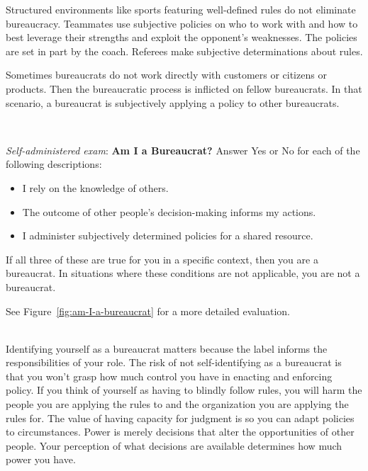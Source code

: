 Structured environments like sports featuring well-defined rules do not eliminate bureaucracy. Teammates use subjective policies on who to work with and how to best leverage their strengths and exploit the opponent's weaknesses. The policies are set in part by the coach. Referees make subjective determinations about rules.

Sometimes bureaucrats do not work directly with customers or citizens or products. Then the bureaucratic process is inflicted on fellow bureaucrats. In that scenario, a bureaucrat is subjectively applying a policy to other bureaucrats. 

\ \\


\begin{quizbox}{
      \textit{Self-administered exam}: 
      \textbf{Am I a Bureaucrat?}
}
Answer Yes or No for each of the following descriptions:
\begin{itemize}
    \item I rely on the knowledge of others. 
    \item The outcome of other people's decision-making informs my actions. 
    \item I administer subjectively determined policies for a shared resource. 
\end{itemize}
If all three of these are true for you in a specific context, then you are a bureaucrat. In situations where these conditions are not applicable, you are not a bureaucrat.
\label{box:self-administered-exam}
\end{quizbox} 
See Figure~\ref{fig:am-I-a-bureaucrat} \iftoggle{haspagenumbers}{ on page~\pageref{fig:am-I-a-bureaucrat}}{}
for a more detailed evaluation.

\ \\

Identifying yourself as a bureaucrat matters because the label informs the responsibilities of your role. The risk of not self-identifying as a bureaucrat is that you won't grasp how much control you have in enacting and enforcing policy. If you think of yourself as having to blindly follow rules, you will harm the people you are applying the rules to and the organization you are applying the rules for. The value of having capacity for judgment is so you can adapt policies to circumstances. Power is merely decisions that alter the opportunities of other people.
Your perception of what decisions are available determines how much power you have.

